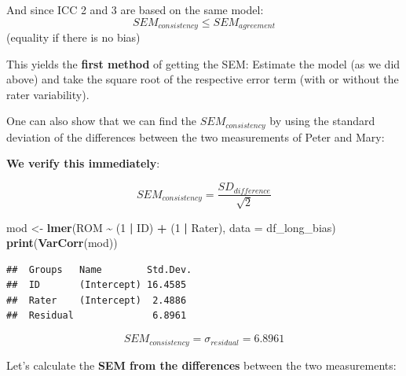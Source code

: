 \documentclass[
]{book}
\newenvironment{Shaded}{\begin{snugshade}}{\end{snugshade}}
\newcommand{\AttributeTok}[1]{\textcolor[rgb]{0.13,0.29,0.53}{#1}}
\newcommand{\CommentTok}[1]{\textcolor[rgb]{0.56,0.35,0.01}{\textit{#1}}}
\newcommand{\DecValTok}[1]{\textcolor[rgb]{0.00,0.00,0.81}{#1}}
\newcommand{\FunctionTok}[1]{\textcolor[rgb]{0.13,0.29,0.53}{\textbf{#1}}}
\newcommand{\NormalTok}[1]{#1}
\newcommand{\OtherTok}[1]{\textcolor[rgb]{0.56,0.35,0.01}{#1}}
\newcommand{\SpecialCharTok}[1]{\textcolor[rgb]{0.81,0.36,0.00}{\textbf{#1}}}
\newcommand{\StringTok}[1]{\textcolor[rgb]{0.31,0.60,0.02}{#1}}
\begin{document}
And since ICC 2 and 3 are based on the same model:
\[SEM_{consistency} \le SEM_{agreement}\]
(equality if there is no bias)

This yields the \textbf{first method} of getting the SEM: Estimate the
model (as we did above) and take the square root of the respective error term
(with or without the rater variability).

One can also show that we can find the \(SEM_{consistency}\) by using
the standard deviation of the differences between the two measurements
of Peter and Mary:

\textbf{We verify this immediately}:

\[SEM_{consistency} = \frac{SD_{difference}}{\sqrt{2}}\]

\begin{Shaded}
\begin{Highlighting}[]
\NormalTok{mod }\OtherTok{\textless{}{-}} \FunctionTok{lmer}\NormalTok{(ROM }\SpecialCharTok{\textasciitilde{}}\NormalTok{ (}\DecValTok{1} \SpecialCharTok{|}\NormalTok{ ID) }\SpecialCharTok{+}\NormalTok{ (}\DecValTok{1} \SpecialCharTok{|}\NormalTok{ Rater), }\AttributeTok{data =}\NormalTok{ df\_long\_bias)}
\FunctionTok{print}\NormalTok{(}\FunctionTok{VarCorr}\NormalTok{(mod))}
\end{Highlighting}
\end{Shaded}

\begin{verbatim}
##  Groups   Name        Std.Dev.
##  ID       (Intercept) 16.4585 
##  Rater    (Intercept)  2.4886 
##  Residual              6.8961
\end{verbatim}

\[SEM_{consistency} = \sigma_{residual} = 6.8961\]

Let's calculate the \textbf{SEM from the differences} between the two measurements:

\begin{Shaded}
\end{Shaded}
\end{document}

